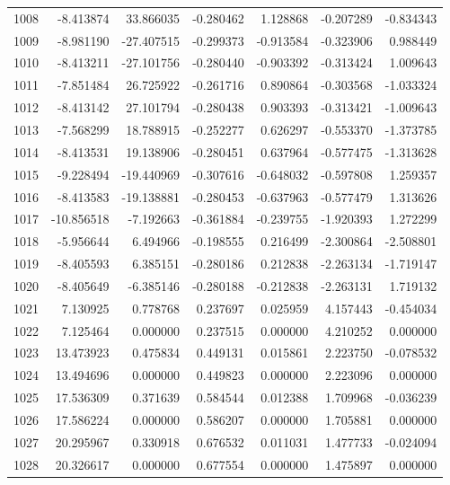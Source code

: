 \begin{tabular}{rrrrrrr}
1008 &  -8.413874 &   33.866035 & -0.280462 &   1.128868 &  -0.207289 & -0.834343 \\
1009 &  -8.981190 &  -27.407515 & -0.299373 &  -0.913584 &  -0.323906 &  0.988449 \\
1010 &  -8.413211 &  -27.101756 & -0.280440 &  -0.903392 &  -0.313424 &  1.009643 \\
1011 &  -7.851484 &   26.725922 & -0.261716 &   0.890864 &  -0.303568 & -1.033324 \\
1012 &  -8.413142 &   27.101794 & -0.280438 &   0.903393 &  -0.313421 & -1.009643 \\
1013 &  -7.568299 &   18.788915 & -0.252277 &   0.626297 &  -0.553370 & -1.373785 \\
1014 &  -8.413531 &   19.138906 & -0.280451 &   0.637964 &  -0.577475 & -1.313628 \\
1015 &  -9.228494 &  -19.440969 & -0.307616 &  -0.648032 &  -0.597808 &  1.259357 \\
1016 &  -8.413583 &  -19.138881 & -0.280453 &  -0.637963 &  -0.577479 &  1.313626 \\
1017 & -10.856518 &   -7.192663 & -0.361884 &  -0.239755 &  -1.920393 &  1.272299 \\
1018 &  -5.956644 &    6.494966 & -0.198555 &   0.216499 &  -2.300864 & -2.508801 \\
1019 &  -8.405593 &    6.385151 & -0.280186 &   0.212838 &  -2.263134 & -1.719147 \\
1020 &  -8.405649 &   -6.385146 & -0.280188 &  -0.212838 &  -2.263131 &  1.719132 \\
1021 &   7.130925 &    0.778768 &  0.237697 &   0.025959 &   4.157443 & -0.454034 \\
1022 &   7.125464 &    0.000000 &  0.237515 &   0.000000 &   4.210252 &  0.000000 \\
1023 &  13.473923 &    0.475834 &  0.449131 &   0.015861 &   2.223750 & -0.078532 \\
1024 &  13.494696 &    0.000000 &  0.449823 &   0.000000 &   2.223096 &  0.000000 \\
1025 &  17.536309 &    0.371639 &  0.584544 &   0.012388 &   1.709968 & -0.036239 \\
1026 &  17.586224 &    0.000000 &  0.586207 &   0.000000 &   1.705881 &  0.000000 \\
1027 &  20.295967 &    0.330918 &  0.676532 &   0.011031 &   1.477733 & -0.024094 \\
1028 &  20.326617 &    0.000000 &  0.677554 &   0.000000 &   1.475897 &  0.000000 \\

\end{tabular}
